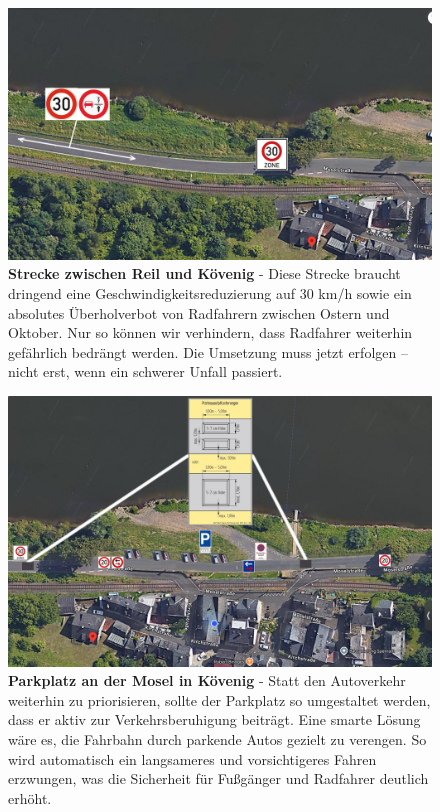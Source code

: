 	\begin{figure}[H]
		\centering
		\includegraphics[width=0.8\linewidth]{"bild6"}
		\caption[Strecke zwischen Reil und Kövenig]{\textbf{Strecke zwischen Reil und Kövenig} - Diese Strecke braucht dringend eine Geschwindigkeitsreduzierung auf 30 km/h sowie ein absolutes Überholverbot von Radfahrern zwischen Ostern und Oktober. Nur so können wir verhindern, dass Radfahrer weiterhin gefährlich bedrängt werden. Die Umsetzung muss jetzt erfolgen – nicht erst, wenn ein schwerer Unfall passiert.}
		\label{fig:Reil-Koevenig}
	\end{figure}
	
	\begin{figure}[H]
		\centering
		\includegraphics[width=0.8\linewidth]{"bild1"}
		\caption[Parkplatz an der Mosel in Kövenig]{\textbf{Parkplatz an der Mosel in Kövenig} - Statt den Autoverkehr weiterhin zu priorisieren, sollte der Parkplatz so umgestaltet werden, dass er aktiv zur Verkehrsberuhigung beiträgt. Eine smarte Lösung wäre es, die Fahrbahn durch parkende Autos gezielt zu verengen. So wird automatisch ein langsameres und vorsichtigeres Fahren erzwungen, was die Sicherheit für Fußgänger und Radfahrer deutlich erhöht.}
		\label{fig:Parkplatz}
	\end{figure}

